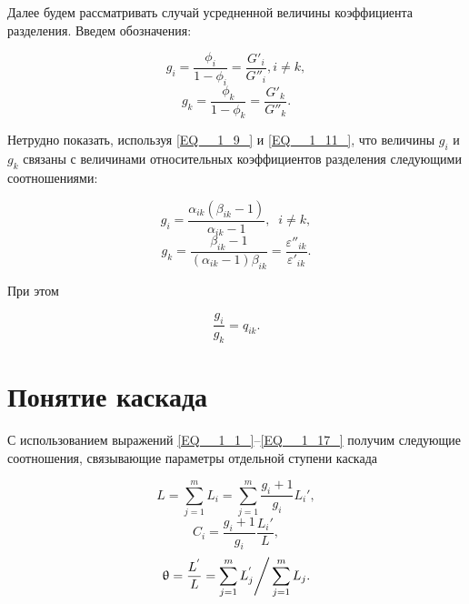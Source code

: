 Далее будем рассматривать случай усредненной величины коэффициента разделения. Введем обозначения:

\begin{equation} \label{EQ__1_13_} 
  g_{i} =\frac{\phi _{i} }{1-\phi _{i} } =\frac{G'_{i} }{G''_{i} } , i\ne k, 
  \end{equation} 
  \begin{equation} \label{EQ__1_14_} 
  g_{k} =\frac{\phi _{k} }{1-\phi _{k} } =\frac{G'_{k} }{G''_{k} } .           
\end{equation} 

Нетрудно показать, используя  \ref{EQ__1_9_} и  \ref{EQ__1_11_}, что величины $g_{i}$ и $g_{k}$  связаны с величинами относительных коэффициентов разделения следующими соотношениями:

\begin{equation} \label{EQ__1_15_} 
  g_{i} =\frac{\alpha _{ik} (\beta _{ik} -1)}{\alpha _{ik} -1} ,\; \; i\ne k,           
  \end{equation} 
  \begin{equation} \label{EQ__1_16_} 
  g_{k} =\frac{\beta _{ik} -1}{(\alpha _{ik} -1)\beta _{ik} } =\frac{\varepsilon ''_{ik} }{\varepsilon '_{ik} } . 
\end{equation} 

При этом

\begin{equation} \label{EQ__1_17_} 
  \frac{g_{i} }{g_{k} } =q_{ik} .           
\end{equation} 

\section{Понятие каскада}

С использованием выражений \ref{EQ__1_1_}--\ref{EQ__1_17_} получим следующие соотношения, связывающие параметры отдельной ступени каскада

\begin{equation} \label{EQ__1_18_} 
  L=\sum _{j=1}^{m}L_{i}  =\sum _{j=1}^{m}\frac{g_{i} +1}{g_{i} }  L_{i} ',               
  \end{equation} 
  \begin{equation} \label{EQ__1_19_} 
  C_{i} =\frac{g_{i} +1}{g_{i} } \frac{L_{i} '}{L} ,         
  \end{equation} 
  \begin{equation} \label{EQ__1_20_} 
  \theta =\frac{L^{'} }{L} ={\sum _{j=1}^{m}L_{j}^{'}  \mathord{\left/ {\vphantom {\sum _{j=1}^{m}L_{j}^{'}   \sum _{j=1}^{m}L_{j}  }} \right. \kern-\nulldelimiterspace} \sum _{j=1}^{m}L_{j}  } .      
\end{equation} 



